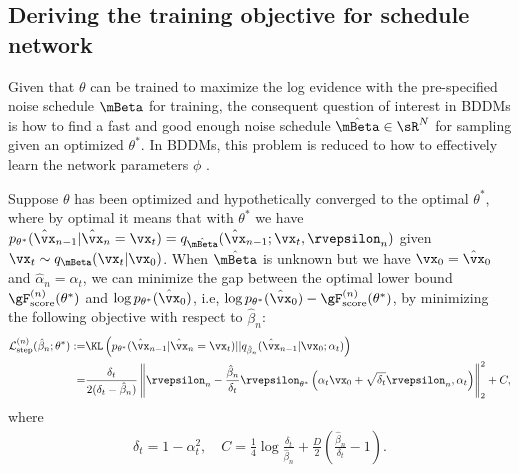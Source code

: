 \subsection{Deriving the training objective for schedule network}
\label{proof:scheduling_network_loss}
Given that $\theta$ can be trained to maximize the log evidence with the pre-specified noise schedule $\mBeta$ for training, the consequent question of interest in BDDMs is how to find a fast and good enough noise schedule $\hat{\mBeta}\in\sR^N$ for sampling given an optimized $\theta^*$. In BDDMs, this problem is reduced to how to effectively learn the network parameters $\phi$ .
\begin{proposition}
\label{prop:phi}
Suppose $\theta$ has been optimized and hypothetically converged to the optimal $\theta^*$, where by optimal it means that with $\theta^*$ we have $p_{\theta^*}(\hat{\vx}_{n-1}|\hat{\vx}_{n}=\vx_t)=q_{\hat{\mBeta}}(\hat{\vx}_{n-1};\vx_t, \rvepsilon_n)$ given $\vx_t\sim q_\mBeta(\vx_{t}|\vx_0)$. When $\hat{\mBeta}$ is unknown but we have $\vx_0=\hat{\vx}_0$ and $\hat{\alpha}_n=\alpha_t$, we can minimize the gap between the optimal lower bound $\gF_\text{score}^{(n)}(\theta^{*})$ and $\log p_{\theta^{*}}(\hat{\vx}_0)$, i.e, $\log p_{\theta^{*}}(\hat{\vx}_0)-\gF_\text{score}^{(n)}(\theta^{*})$, by minimizing the following objective with respect to $\hat{\beta}_n$:
\begin{align}
\mathcal{L}_\text{step}^{(n)}(\hat{\beta}_n;\theta^{*}):=&\KL\left(p_{\theta^{*}}(\hat{\vx}_{n-1}|\hat{\vx}_{n}=\vx_t)||q_{\hat{\beta}_n}(\hat{\vx}_{n-1}|\vx_{0};{\alpha}_{t})\right)\\
=&\frac{\delta_t}{2(\delta_t-\hat{\beta}_n)}\left\lVert\rvepsilon_n - \frac{\hat{\beta}_n}{\delta_t}\rvepsilon_{\theta^*}\left(\alpha_t\vx_0+\sqrt{\delta_t}\rvepsilon_n, \alpha_t\right) \right\rVert^2_2 + C,
\end{align}
where
\begin{align}
\delta_t=1-\alpha_t^2,\quad C=\frac{1}{4}\log \frac{\delta_t}{\hat{\beta}_n}+\frac{D}{2}\left(\frac{\hat{\beta}_n}{\delta_t}-1\right).
\end{align}


\end{proposition}
